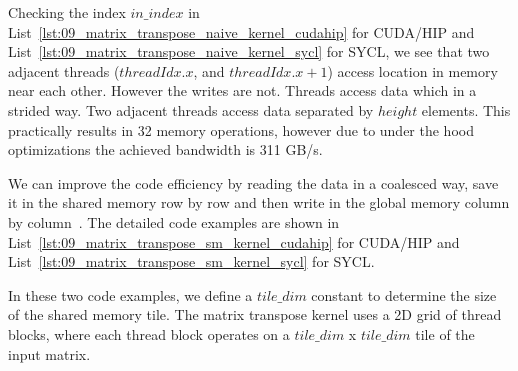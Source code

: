 \par
Checking the index $in\_index$ in List~\ref{lst:09_matrix_transpose_naive_kernel_cudahip} for CUDA/HIP and List~\ref{lst:09_matrix_transpose_naive_kernel_sycl} for SYCL, we see that two adjacent threads ($threadIdx.x$, and $threadIdx.x+1$) access location in memory near each other.
However the writes are not.
Threads access data which in a strided way.
Two adjacent threads access data separated by $height$ elements.
This practically results in 32 memory operations, however due to under the hood optimizations the achieved bandwidth is 311 GB/s.







\par
We can improve the code efficiency by reading the data in a coalesced way, save it in the shared memory row by row and then write in the global memory column by column~\cite{matrix_transpose_efficient, matrix_transpose_advanced}.
The detailed code examples are shown in List~\ref{lst:09_matrix_transpose_sm_kernel_cudahip} for CUDA/HIP and List~\ref{lst:09_matrix_transpose_sm_kernel_sycl} for SYCL.







\par
In these two code examples, we define a $tile\_dim$ constant to determine the size of the shared memory tile.
The matrix transpose kernel uses a 2D grid of thread blocks, where each thread block operates on a $tile\_dim$ x $tile\_dim$ tile of the input matrix.

